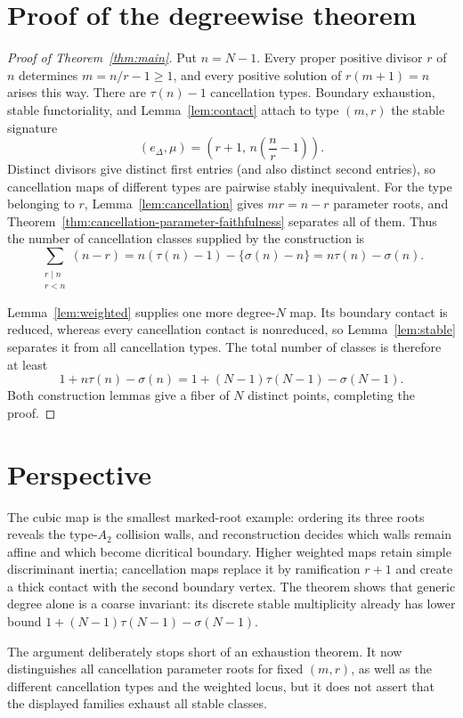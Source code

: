 \documentclass[11pt]{article}
\begin{document}








\section{Proof of the degreewise theorem}

\begin{proof}[Proof of Theorem~\ref{thm:main}]
Put $n=N-1$.  Every proper positive divisor $r$ of $n$ determines
$m=n/r-1\ge1$, and every positive solution of $r(m+1)=n$ arises this way.
There are $\tau(n)-1$ cancellation types.  Boundary exhaustion, stable
functoriality, and Lemma~\ref{lem:contact} attach to type $(m,r)$ the stable
signature
\[
 (e_\Delta,\mu)=
 \left(r+1,\,n\left(\frac nr-1\right)\right).             \tag{8.1}
\]
Distinct divisors give distinct first entries (and also distinct second
entries), so cancellation maps of different types are pairwise stably
inequivalent.  For the type belonging to $r$,
Lemma~\ref{lem:cancellation} gives $mr=n-r$ parameter roots, and
Theorem~\ref{thm:cancellation-parameter-faithfulness} separates all of them.
Thus the number of cancellation classes supplied by the construction is
\[
 \sum_{\substack{r\mid n\\r<n}}(n-r)
 =n(\tau(n)-1)-\{\sigma(n)-n\}
 =n\tau(n)-\sigma(n).                                  \tag{8.2}
\]

Lemma~\ref{lem:weighted} supplies one more degree-$N$ map.  Its boundary
contact is reduced, whereas every cancellation contact is nonreduced, so
Lemma~\ref{lem:stable} separates it from all cancellation types.  The total
number of classes is therefore at least
\[
 1+n\tau(n)-\sigma(n)
 =1+(N-1)\tau(N-1)-\sigma(N-1).
\]
Both construction lemmas give a fiber of $N$ distinct points, completing the
proof.
\end{proof}

\section{Perspective}

The cubic map is the smallest marked-root example: ordering its three roots
reveals the type-$A_2$ collision walls, and reconstruction decides which
walls remain affine and which become dicritical boundary.  Higher weighted
maps retain simple discriminant inertia; cancellation maps replace it by
ramification $r+1$ and create a thick contact with the second boundary
vertex.  The theorem shows that generic degree alone is a coarse invariant:
its discrete stable multiplicity already has lower bound
$1+(N-1)\tau(N-1)-\sigma(N-1)$.

The argument deliberately stops short of an exhaustion theorem.  It now
distinguishes all cancellation parameter roots for fixed $(m,r)$, as well as
the different cancellation types and the weighted locus, but it does not
assert that the displayed families exhaust all stable classes.
\end{document}
